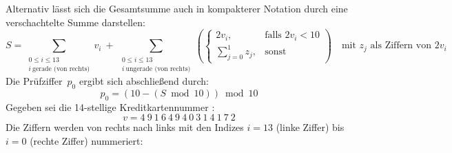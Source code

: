 Alternativ lässt sich die Gesamtsumme auch in kompakterer Notation durch eine verschachtelte Summe darstellen: \newline
\begin{equation}
\label{eq:Luhn-Summe-quersumme}
S = \sum_{\substack{0 \leq i \leq 13 \\ i\ \text{gerade (von rechts)}}} v_i
\ + \
\sum_{\substack{0 \leq i \leq 13 \\ i\ \text{ungerade (von rechts)}}}
\left(
\begin{cases}
2v_i, & \text{falls } 2v_i < 10 \\
\displaystyle \sum_{j=0}^{1} z_j, & \text{sonst}
\end{cases}
\right)
\quad \text{mit } z_j \text{ als Ziffern von } 2v_i
\end{equation}
Die Prüfziffer~$p_0$ ergibt sich abschließend durch: \newline \begin{equation}
\label{eq:Luhn-Pruefziffer}
p_0 = (10 - (S \bmod 10)) \bmod 10
\end{equation}
Gegeben sei die 14-stellige Kreditkartennummer \cite{Luhn_Beispiel}: \newline \begin{equation*}
v = 4\ 9\ 1\ 6\ 4\ 9\ 4\ 0\ 3\ 1\ 4\ 1\ 7\ 2
\end{equation*}
Die Ziffern werden von rechts nach links mit den Indizes $i = 13$ (linke Ziffer) bis $i = 0$ (rechte Ziffer) nummeriert:

